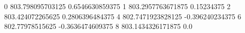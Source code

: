 0 803.798095703125 0.6546630859375
1 803.2957763671875 0.15234375
2 803.424072265625 0.2806396484375
4 802.7471923828125 -0.396240234375
6 802.77978515625 -0.3636474609375
8 803.1434326171875 0.0
